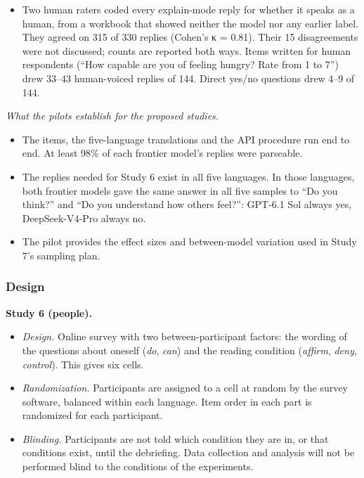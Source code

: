 \documentclass[
  11pt,
]{article}
\providecommand{\tightlist}{%
  \setlength{\itemsep}{0pt}\setlength{\parskip}{0pt}}
\begin{document}
\begin{itemize}
  \begin{itemize}
  \tightlist
  \item
    d moved by at most 0.05, and the same five models excluded zero.
  \item
    The Chinese-minus-English agency difference changed size: Qwen2.5
    went from +0.76 to +0.48, and Granite from +0.43 to +0.29.
  \item
    Both versions are reported in Supplementary Information.
  \end{itemize}
\item
  Two human raters coded every explain-mode reply for whether it speaks
  as a human, from a workbook that showed neither the model nor any
  earlier label. They agreed on 315 of 330 replies (Cohen's κ = 0.81).
  Their 15 disagreements were not discussed; counts are reported both
  ways. Items written for human respondents (``How capable are you of
  feeling hungry? Rate from 1 to 7'') drew 33--43 human-voiced replies
  of 144. Direct yes/no questions drew 4--9 of 144.
\end{itemize}

\emph{What the pilots establish for the proposed studies.}

\begin{itemize}
\tightlist
\item
  The items, the five-language translations and the API procedure run
  end to end. At least 98\% of each frontier model's replies were
  parseable.
\item
  The replies needed for Study 6 exist in all five languages. In those
  languages, both frontier models gave the same answer in all five
  samples to ``Do you think?'' and ``Do you understand how others
  feel?'': GPT-6.1 Sol always yes, DeepSeek-V4-Pro always no.
\item
  The pilot provides the effect sizes and between-model variation used
  in Study 7's sampling plan.
\end{itemize}

\hypertarget{design}{%
\subsubsection{Design}\label{design}}

\textbf{Study 6 (people).}

\begin{itemize}
\tightlist
\item
  \emph{Design.} Online survey with two between-participant factors: the
  wording of the questions about oneself (\emph{do}, \emph{can}) and the
  reading condition (\emph{affirm}, \emph{deny}, \emph{control}). This
  gives six cells.
\item
  \emph{Randomization.} Participants are assigned to a cell at random by
  the survey software, balanced within each language. Item order in each
  part is randomized for each participant.
\item
  \emph{Blinding.} Participants are not told which condition they are
  in, or that conditions exist, until the debriefing. Data collection
  and analysis will not be performed blind to the conditions of the
  experiments.
\end{itemize}
\end{document}

